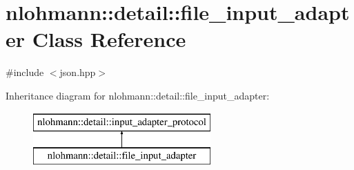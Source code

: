 \hypertarget{classnlohmann_1_1detail_1_1file__input__adapter}{}\section{nlohmann\+::detail\+::file\+\_\+input\+\_\+adapter Class Reference}
\label{classnlohmann_1_1detail_1_1file__input__adapter}


{\ttfamily \#include $<$json.\+hpp$>$}

Inheritance diagram for nlohmann\+::detail\+::file\+\_\+input\+\_\+adapter\+:\begin{figure}[H]
\begin{center}
\leavevmode
\includegraphics[height=2.000000cm]{da/d14/classnlohmann_1_1detail_1_1file__input__adapter}
\end{center}
\end{figure}
